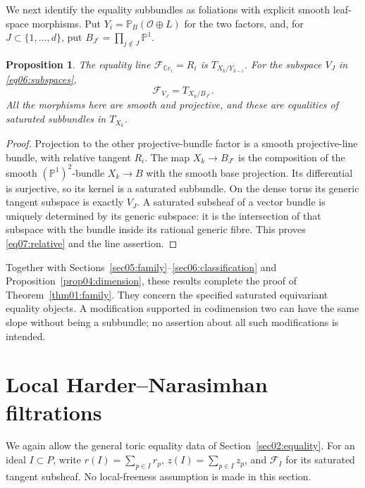 \documentclass[11pt]{amsart}
\newtheorem{proposition}[theorem]{Proposition}
\theoremstyle{definition}
\theoremstyle{remark}
\newcommand{\CC}{\mathbb C}
\newcommand{\PP}{\mathbb P}
\newcommand{\cO}{\mathcal O}
\begin{document}
We next identify the equality subbundles as foliations with explicit
smooth leaf-space morphisms. Put \(Y_i=\PP_B(\cO\oplus L)\) for
the two factors, and, for \(J\subset\{1,\ldots,d\}\), put
\(B_{J^c}=\prod_{j\notin J}\PP^1\).

\begin{proposition}\label{prop07:relative}
The equality line \(\mathcal F_{\CC e_i}=R_i\) is
\(T_{X_k/Y_{3-i}}\). For the subspace \(V_J\) in
\eqref{eq06:subspaces},
\begin{equation}\label{eq07:relative}
 \mathcal F_{V_J}=T_{X_k/B_{J^c}}.
\end{equation}
All the morphisms here are smooth and projective, and these are
equalities of saturated subbundles in \(T_{X_k}\).
\end{proposition}

\begin{proof}
Projection to the other projective-bundle factor is a smooth
projective-line bundle, with relative tangent \(R_i\).
The map \(X_k\to B_{J^c}\) is the composition of the smooth
\((\PP^1)^2\)-bundle \(X_k\to B\) with the smooth base projection.
Its differential is surjective, so its kernel is a saturated
subbundle. On the dense torus its generic tangent subspace is
exactly \(V_J\). A saturated subsheaf of a vector bundle is uniquely
determined by its generic subspace: it is the intersection of that
subspace with the bundle inside its rational generic fibre.
This proves \eqref{eq07:relative} and the line assertion.
\end{proof}

Together with Sections~\ref{sec05:family}--\ref{sec06:classification}
and Proposition~\ref{prop04:dimension}, these results complete the
proof of Theorem~\ref{thm01:family}. They concern the specified
saturated equivariant equality objects. A modification supported in
codimension two can have the same slope without being a subbundle;
no assertion about all such modifications is intended.

\section{Local Harder--Narasimhan filtrations}\label{sec08:hn}

We again allow the general toric equality data of
Section~\ref{sec02:equality}. For an ideal \(I\subset P\), write
\(r(I)=\sum_{p\in I}r_p\), \(z(I)=\sum_{p\in I}z_p\), and
\(\mathcal F_I\) for its saturated tangent subsheaf.
No local-freeness assumption is made in this section.
\end{document}
